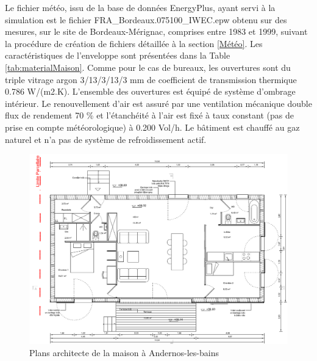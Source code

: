 Le fichier météo, issu de la base de données EnergyPlus, ayant servi à la simulation est le fichier FRA\_Bordeaux.075100\_IWEC.epw obtenu sur des mesures, sur le site de Bordeaux-Mérignac, comprises entre 1983 et 1999, suivant la procédure de création de fichiers détaillée à la section \ref{Météo}. Les caractéristiques de l'enveloppe sont présentées dans la Table \ref{tab:materialMaison}. Comme pour le cas de bureaux, les ouvertures sont du triple vitrage argon 3/13/3/13/3 mm de coefficient de transmission thermique 0.786 W/(m2.K). L'ensemble des ouvertures est équipé de système d'ombrage intérieur. Le renouvellement d'air est assuré par une ventilation mécanique double flux de rendement 70 \% et l'étanchéité à l'air est fixé à taux constant (pas de prise en compte météorologique) à 0.200 Vol/h. Le bâtiment est chauffé au gaz naturel et n'a pas de système de refroidissement actif.

\begin{figure}[H]
\centering
\includegraphics[scale=0.55]{Images/PlanMaison}
\caption{Plans architecte de la maison à Andernos-les-bains}
\label{fig:PlanMaison}
\end{figure}

